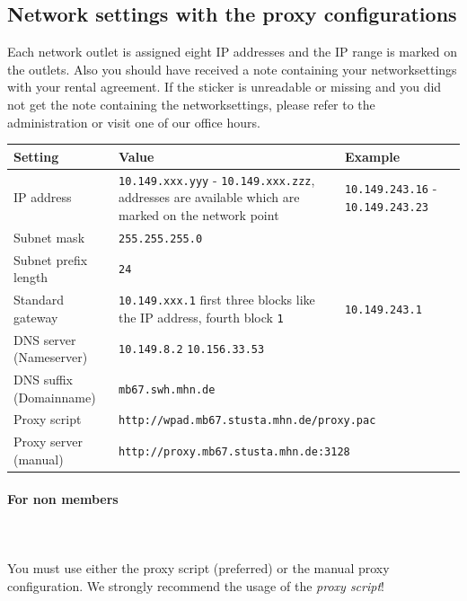 \documentclass[a4paper,12pt]{scrartcl}
\begin{document}
\subsection*{Network settings with the proxy configurations}
Each network outlet is assigned eight IP addresses and the IP range is marked on the outlets. Also you should have received a note containing your networksettings with your rental agreement. If the sticker is unreadable or missing and you did not get the note containing the networksettings, please refer to the administration or visit one of our office hours.

\newpage
\begin{center}
  \begin{tabularx}{\linewidth}{|lXp{.2\linewidth}|}
    \hline
    Setting & Value & Example \\
    \hline \hline
    IP address & \nolinkurl{10.149.xxx.yyy} - \nolinkurl{10.149.xxx.zzz}, \newline 8 addresses are available which are marked on the network point & \nolinkurl{10.149.243.16} - \nolinkurl{10.149.243.23} \\
    \hline
    Subnet mask & \nolinkurl{255.255.255.0} & \\
    \hline
    Subnet prefix length & \nolinkurl{24} & \\
    \hline
    Standard gateway & \nolinkurl{10.149.xxx.1} \newline first three blocks like the IP address, fourth block \nolinkurl{1} & \nolinkurl{10.149.243.1} \\
    \hline
    DNS server (Nameserver) & \nolinkurl{10.149.8.2} \newline \nolinkurl{10.156.33.53} & \\
    \hline
    DNS suffix (Domainname) & \nolinkurl{mb67.swh.mhn.de} & \\
    \hline
    Proxy script & \multicolumn{2}{l|}{\nolinkurl{http://wpad.mb67.stusta.mhn.de/proxy.pac}} \\
    \hline
    Proxy server (manual) & \multicolumn{2}{l|}{\nolinkurl{http://proxy.mb67.stusta.mhn.de:3128}} \\
    \hline
  \end{tabularx}
\end{center}


\paragraph*{For non members}~\\
\\
You must use either the proxy script (preferred) or the manual proxy configuration. We strongly recommend the usage of the \emph{proxy script}!
\end{document}

